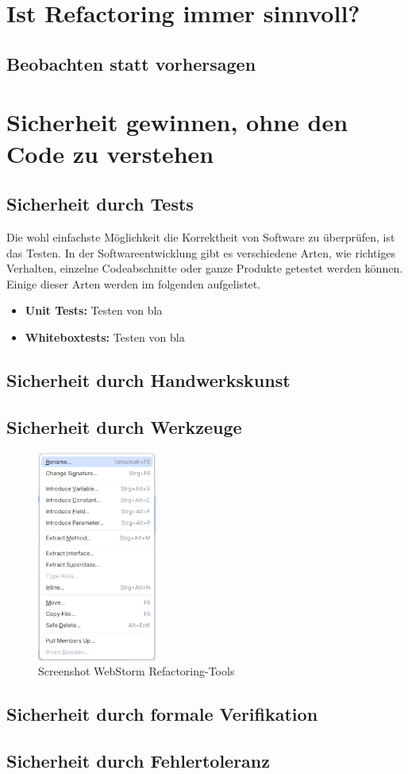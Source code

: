 \chapter{Ist Refactoring immer sinnvoll?}
\section{Beobachten statt vorhersagen}


\chapter{Sicherheit gewinnen, ohne den Code zu verstehen}
\section{Sicherheit durch Tests}
Die wohl einfachste Möglichkeit die Korrektheit von Software zu überprüfen, ist das Testen. In der Softwareentwicklung gibt es verschiedene Arten, wie richtiges Verhalten, einzelne Codeabschnitte oder ganze Produkte getestet werden können. Einige dieser Arten werden im folgenden aufgelistet.
\begin{itemize}
  \item \textbf{Unit Tests:} Testen von bla
  \item \textbf{Whiteboxtests:} Testen von bla
\end{itemize}
\section{Sicherheit durch Handwerkskunst}
\section{Sicherheit durch Werkzeuge}
\lipsum[1] %

\begin{figure}
  \centering
  \includegraphics[width=0.35\textwidth]{Bilder/screenshotWebstorm} %
  \caption{Screenshot WebStorm Refactoring-Tools \cite{webstorm.2024}}
\end{figure}

\lipsum[2-4] %
\section{Sicherheit durch formale Verifikation}
\section{Sicherheit durch Fehlertoleranz}